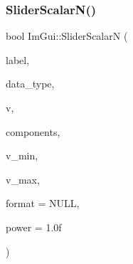 \subsubsection{\texorpdfstring{Slider\+Scalar\+N()}{SliderScalarN()}}
{\footnotesize\ttfamily bool Im\+Gui\+::\+Slider\+ScalarN (\begin{DoxyParamCaption}\item[{const char $\ast$}]{label,  }\item[{\mbox{\hyperlink{imgui_8h_a4cfa8697a3d76722fff83eb18922e9d5}{Im\+Gui\+Data\+Type}}}]{data\+\_\+type,  }\item[{void $\ast$}]{v,  }\item[{int}]{components,  }\item[{const void $\ast$}]{v\+\_\+min,  }\item[{const void $\ast$}]{v\+\_\+max,  }\item[{const char $\ast$}]{format = {\ttfamily NULL},  }\item[{float}]{power = {\ttfamily 1.0f} }\end{DoxyParamCaption})}

